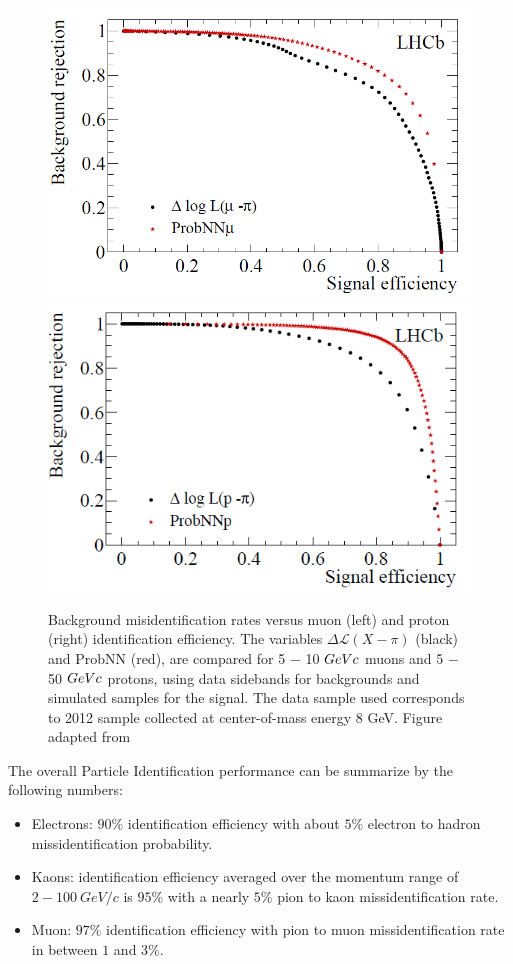 \begin{figure}[h]
 \begin{center}
  \includegraphics[width=0.49\linewidth]{figures/PID_prob_left.PNG}
   \includegraphics[width=0.49\linewidth]{figures/PID_prob_right.PNG}
    \caption{Background misidentification rates versus muon (left) and proton (right)
identification efficiency. The variables $\Delta \mathcal{L} (X −\pi)$
(black) and ProbNN (red), are compared for 5 − 10 $GeV\/c$ muons and 5 − 50 $GeV\/c$ protons,
using data sidebands for backgrounds and simulated samples for the signal. The data sample
used corresponds to 2012 sample collected at center-of-mass energy 8 GeV. Figure adapted from \cite{PID}}%
\label{fig:PID baseline}%
 \end{center}
\end{figure}

The overall Particle Identification performance can be summarize by the following numbers:

\begin{itemize}
    \item Electrons: $90\%$ identification efficiency with about $5\%$ electron to hadron missidentification probability. 
    \item Kaons: identification efficiency averaged over the momentum range of\\ $2-100~ GeV/c$ is $95\%$ with a nearly $5\%$ pion to kaon missidentification rate. 
    \item Muon: $97\%$ identification efficiency with pion to muon missidentification rate in between $1$ and $3\%$.  
\end{itemize}


